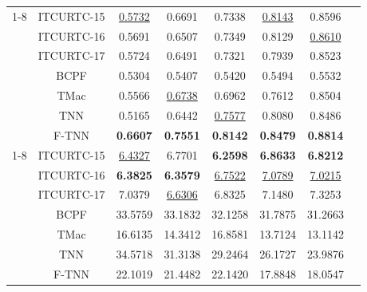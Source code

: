 \documentclass[twoside,12pt]{article}
\begin{document}
\begin{table}[!th]
{\begin{tabular}{|c|c|cccccc|}
\cline{1-8}
\multicolumn{1}{|c|}{\multirow{6}{*}{$\mathrm{SSIM}$}} & ITCURTC-15 &\underline{0.5732} &   0.6691   & 0.7338  &  \underline{0.8143}  &  0.8596& \\
& ITCURTC-16 & 0.5691 &   0.6507  &  0.7349  &  0.8129   & \underline{0.8610}
& \\
& ITCURTC-17 & 0.5724  &  0.6491    &0.7321  &  0.7939   & 0.8523& \\
& BCPF & 0.5304  &  0.5407  &  0.5420 &   0.5494   & 0.5532& \\
& TMac & 0.5566  & \underline{0.6738}  &  0.6962 &   0.7612  &  0.8504 & \\
& TNN & 0.5165  &  0.6442 &   \underline{0.7577}   & 0.8080   & 0.8486& \\
& F-TNN & \textbf{0.6607}  &  \textbf{0.7551} &   \textbf{0.8142}  & \textbf{0.8479}  &  \textbf{0.8814}& \\
\cline{1-8}
\multicolumn{1}{|c|}{\multirow{6}{*}{$\mathrm{Runtime}$}} & ITCURTC-15 & \underline{6.4327} &   6.7701  &  \textbf{6.2598} & \textbf{6.8633}   & \textbf{6.8212}& \\
& ITCURTC-16 & \textbf{6.3825} & \textbf{6.3579}  &  \underline{6.7522}&   \underline{ 7.0789}  & \underline{ 7.0215} &\\
& ITCURTC-17 &7.0379 &   \underline{6.6306}& 6.8325 &   7.1480&7.3253& \\
&BCPF & 33.5759 &  33.1832 &  32.1258 &  31.7875  & 31.2663& \\
& TMac &  16.6135&   14.3412 &  16.8581 &  13.7124  & 13.1142&\\
& TNN &34.5718  & 31.3138&   29.2464 &  26.1727  & 23.9876& \\
& F-TNN & 22.1019  & 21.4482 &  22.1420&   17.8848  & 18.0547& \\
\bottomrule
\end{tabular}
}
\vspace{-5mm}
\end{table}

 
\end{document}

